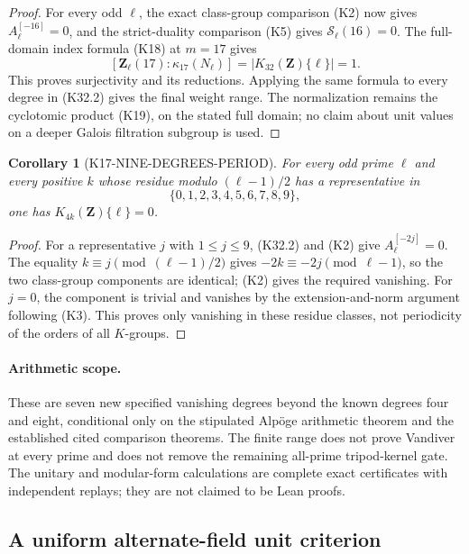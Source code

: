\documentclass[11pt,a4paper]{article}
\newtheorem{corollary}[theorem]{Corollary}
\theoremstyle{definition}
\begin{document}
\begin{proof}
For every odd $\ell$, the exact class-group comparison (K2) now
gives $A_\ell^{[-16]}=0$, and the strict-duality comparison (K5)
gives $\mathcal S_\ell(16)=0$. The full-domain index formula (K18)
at $m=17$ gives
\[
 [\mathbf Z_\ell(17):\kappa_{17}(N_\ell)]
       =|K_{32}(\mathbf Z)\{\ell\}|=1.
\]
This proves surjectivity and its reductions. Applying the same
formula to every degree in (K32.2) gives the final weight range.
The normalization remains the cyclotomic product (K19), on the
stated full domain; no claim about unit values on a deeper
Galois filtration subgroup is used.
\end{proof}

\begin{corollary}[K17-NINE-DEGREES-PERIOD]
\label{cor:nine-degrees-period}
For every odd prime $\ell$ and every positive $k$ whose residue
modulo $(\ell-1)/2$ has a representative in
\[
                            \{0,1,2,3,4,5,6,7,8,9\},
\]
one has $K_{4k}(\mathbf Z)\{\ell\}=0$.
\end{corollary}

\begin{proof}
For a representative $j$ with $1\leq j\leq9$, (K32.2) and (K2)
give $A_\ell^{[-2j]}=0$. The equality
$k\equiv j\pmod{(\ell-1)/2}$ gives
$-2k\equiv-2j\pmod{\ell-1}$, so the two class-group components
are identical; (K2) gives the required vanishing. For $j=0$, the
component is trivial and vanishes by the extension-and-norm
argument following (K3). This proves only vanishing in these
residue classes, not periodicity of the orders of all $K$-groups.
\end{proof}

\paragraph{Arithmetic scope.}
These are seven new specified vanishing degrees beyond the known
degrees four and eight, conditional only on the stipulated Alp\"oge
arithmetic theorem and the established cited comparison theorems.
The finite range does not prove Vandiver at every prime and does
not remove the remaining all-prime tripod-kernel gate. The unitary
and modular-form calculations are complete exact certificates
with independent replays; they are not claimed to be Lean proofs.

\subsection{A uniform alternate-field unit criterion}
\label{sec:minus7-general-source}
\end{document}
